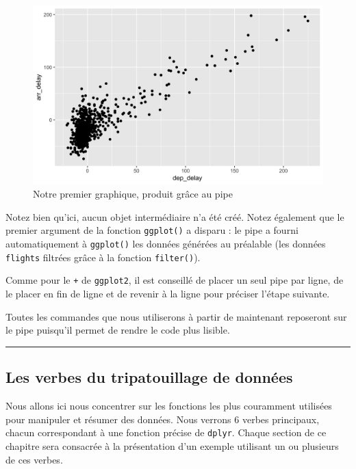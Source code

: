 \documentclass[a4paperpaper,]{article}
\theoremstyle{definition}
\theoremstyle{definition}
\theoremstyle{definition}
\theoremstyle{remark}
\begin{document}
\begin{figure}[htpb]

{\centering \includegraphics[width=0.9\linewidth]{figure/unnamed-chunk-94-1} 

}

\caption{Notre premier graphique, produit grâce au pipe}\label{fig:unnamed-chunk-94}
\end{figure}

Notez bien qu'ici, aucun objet intermédiaire n'a été créé. Notez
également que le premier argument de la fonction \texttt{ggplot()} a
disparu : le pipe a fourni automatiquement à \texttt{ggplot()} les
données générées au préalable (les données \texttt{flights} filtrées
grâce à la fonction \texttt{filter()}).

Comme pour le \texttt{+} de \texttt{ggplot2}, il est conseillé de placer
un seul pipe par ligne, de le placer en fin de ligne et de revenir à la
ligne pour préciser l'étape suivante.

Toutes les commandes que nous utiliserons à partir de maintenant
reposeront sur le pipe puisqu'il permet de rendre le code plus lisible.

\begin{center}\rule{0.5\linewidth}{\linethickness}\end{center}

\hypertarget{les-verbes-du-tripatouillage-de-donnees}{%
\subsection{Les verbes du tripatouillage de
données}\label{les-verbes-du-tripatouillage-de-donnees}}

Nous allons ici nous concentrer sur les fonctions les plus couramment
utilisées pour manipuler et résumer des données. Nous verrons 6 verbes
principaux, chacun correspondant à une fonction précise de
\texttt{dplyr}. Chaque section de ce chapitre sera consacrée à la
présentation d'un exemple utilisant un ou plusieurs de ces verbes.
\end{document}
